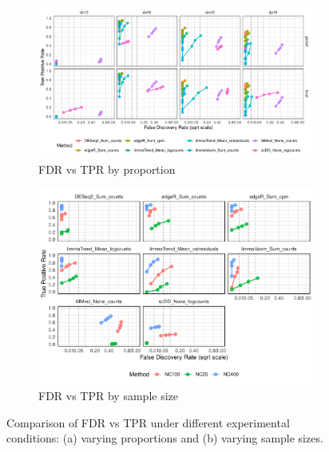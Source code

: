 \documentclass[a4paper, 11pt, twocolumn]{article}
\begin{document}
\begin{figure}[H]
	\centering
	\begin{subfigure}[t]{0.9\textwidth}
		\centering
		\includegraphics[width=\textwidth]{figs/fdrtpr_prop_method_Testis.pdf}
		\caption{FDR vs TPR by proportion}
		\label{fig:fdrtpr_prop_testis}
	\end{subfigure}
	
	\vspace{1em}
	
	\begin{subfigure}[t]{0.8\textwidth}
		\centering
		\includegraphics[width=\textwidth]{figs/fdrtpr_size_method_Testis.pdf}
		\caption{FDR vs TPR by sample size}
		\label{fig:fdrtpr_testis}
	\end{subfigure}
	
	\caption{Comparison of FDR vs TPR under different experimental conditions: (a) varying proportions and (b) varying sample sizes.}
	\label{fig:fdrtpr_combined_testis}
\end{figure}
\end{document}
